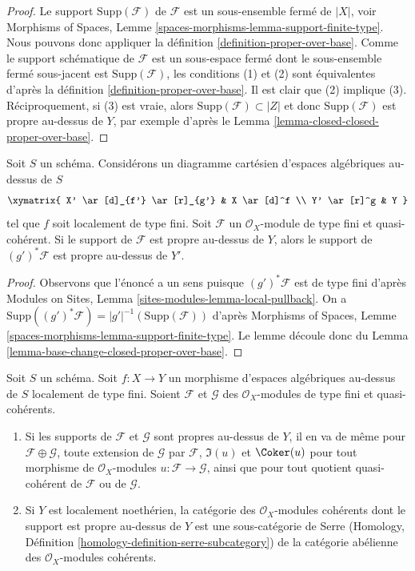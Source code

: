 \begin{proof}
Le support $\text{Supp}(\mathcal{F})$ de $\mathcal{F}$ est un sous-ensemble fermé
de $|X|$, voir Morphisms of Spaces, Lemme
\ref{spaces-morphisms-lemma-support-finite-type}.
Nous pouvons donc appliquer la définition \ref{definition-proper-over-base}.
Comme le support schématique de $\mathcal{F}$ est un sous-espace fermé
dont le sous-ensemble fermé sous-jacent est $\text{Supp}(\mathcal{F})$,
les conditions (1) et (2) sont équivalentes d'après la
définition \ref{definition-proper-over-base}.
Il est clair que (2) implique (3).
Réciproquement, si (3) est vraie, alors
$\text{Supp}(\mathcal{F}) \subset |Z|$
et donc $\text{Supp}(\mathcal{F})$
est propre au-dessus de $Y$, par exemple d'après le
Lemma \ref{lemma-closed-closed-proper-over-base}.
\end{proof}

\begin{lemma}
\label{lemma-base-change-module-support-proper-over-base}
Soit $S$ un schéma.
Considérons un diagramme cartésien d'espaces algébriques au-dessus de $S$
$$
\xymatrix{
X' \ar[d]_{f'} \ar[r]_{g'} & X \ar[d]^f \\
Y' \ar[r]^g & Y
}
$$
tel que $f$ soit localement de type fini. Soit $\mathcal{F}$ un
$\mathcal{O}_X$-module de type fini et quasi-cohérent.
Si le support de $\mathcal{F}$ est propre au-dessus de $Y$, alors
le support de $(g')^*\mathcal{F}$ est propre au-dessus de $Y'$.
\end{lemma}

\begin{proof}
Observons que l'énoncé a un sens puisque
$(g')^*\mathcal{F}$ est de type fini d'après
Modules on Sites, Lemma \ref{sites-modules-lemma-local-pullback}.
On a $\text{Supp}((g')^*\mathcal{F}) = |g'|^{-1}(\text{Supp}(\mathcal{F}))$
d'après Morphisms of Spaces, Lemme \ref{spaces-morphisms-lemma-support-finite-type}.
Le lemme découle donc du
Lemma \ref{lemma-base-change-closed-proper-over-base}.
\end{proof}

\begin{lemma}
\label{lemma-cat-module-support-proper-over-base}
Soit $S$ un schéma.
Soit $f : X \to Y$ un morphisme d'espaces algébriques au-dessus de $S$
localement de type fini. Soient $\mathcal{F}$ et $\mathcal{G}$
des $\mathcal{O}_X$-modules de type fini et quasi-cohérents.
\begin{enumerate}
\item Si les supports de $\mathcal{F}$ et $\mathcal{G}$
sont propres au-dessus de $Y$, il en va de même
pour $\mathcal{F} \oplus \mathcal{G}$, toute extension
de $\mathcal{G}$ par $\mathcal{F}$, $\Im(u)$ et $\Coker(u)$
pour tout morphisme de $\mathcal{O}_X$-modules $u : \mathcal{F} \to \mathcal{G}$,
ainsi que pour tout quotient quasi-cohérent de $\mathcal{F}$ ou de $\mathcal{G}$.
\item Si $Y$ est localement noethérien, la catégorie des
$\mathcal{O}_X$-modules cohérents dont le support est propre au-dessus de
$Y$ est une sous-catégorie de Serre (Homology, Définition
\ref{homology-definition-serre-subcategory})
de la catégorie abélienne des $\mathcal{O}_X$-modules cohérents.
\end{enumerate}
\end{lemma}

